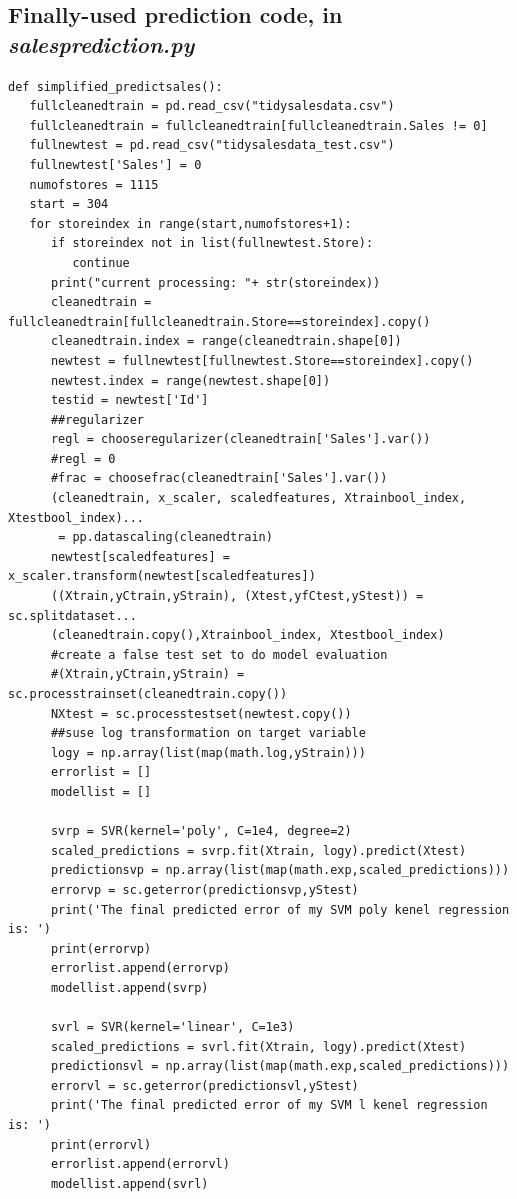 \documentclass[11pt]{article}
\begin{document}
\subsection{Finally-used prediction code, in \emph{salesprediction.py}}
\begin{verbatim}
def simplified_predictsales():
   fullcleanedtrain = pd.read_csv("tidysalesdata.csv")
   fullcleanedtrain = fullcleanedtrain[fullcleanedtrain.Sales != 0]
   fullnewtest = pd.read_csv("tidysalesdata_test.csv")
   fullnewtest['Sales'] = 0
   numofstores = 1115
   start = 304
   for storeindex in range(start,numofstores+1):
      if storeindex not in list(fullnewtest.Store):
         continue
      print("current processing: "+ str(storeindex))
      cleanedtrain = fullcleanedtrain[fullcleanedtrain.Store==storeindex].copy()
      cleanedtrain.index = range(cleanedtrain.shape[0])
      newtest = fullnewtest[fullnewtest.Store==storeindex].copy()
      newtest.index = range(newtest.shape[0])
      testid = newtest['Id']
      ##regularizer
      regl = chooseregularizer(cleanedtrain['Sales'].var())
      #regl = 0
      #frac = choosefrac(cleanedtrain['Sales'].var())
      (cleanedtrain, x_scaler, scaledfeatures, Xtrainbool_index, Xtestbool_index)...
       = pp.datascaling(cleanedtrain)
      newtest[scaledfeatures] = x_scaler.transform(newtest[scaledfeatures])
      ((Xtrain,yCtrain,yStrain), (Xtest,yfCtest,yStest)) = sc.splitdataset...
      (cleanedtrain.copy(),Xtrainbool_index, Xtestbool_index) 
      #create a false test set to do model evaluation
      #(Xtrain,yCtrain,yStrain) = sc.processtrainset(cleanedtrain.copy())
      NXtest = sc.processtestset(newtest.copy())
      ##suse log transformation on target variable
      logy = np.array(list(map(math.log,yStrain)))
      errorlist = []
      modellist = []
      
      svrp = SVR(kernel='poly', C=1e4, degree=2)
      scaled_predictions = svrp.fit(Xtrain, logy).predict(Xtest)
      predictionsvp = np.array(list(map(math.exp,scaled_predictions)))
      errorvp = sc.geterror(predictionsvp,yStest)
      print('The final predicted error of my SVM poly kenel regression is: ')
      print(errorvp)
      errorlist.append(errorvp)
      modellist.append(svrp)
      
      svrl = SVR(kernel='linear', C=1e3)
      scaled_predictions = svrl.fit(Xtrain, logy).predict(Xtest)
      predictionsvl = np.array(list(map(math.exp,scaled_predictions)))
      errorvl = sc.geterror(predictionsvl,yStest)
      print('The final predicted error of my SVM l kenel regression is: ')
      print(errorvl)
      errorlist.append(errorvl)
      modellist.append(svrl)
      

\end{verbatim}
\end{document}
